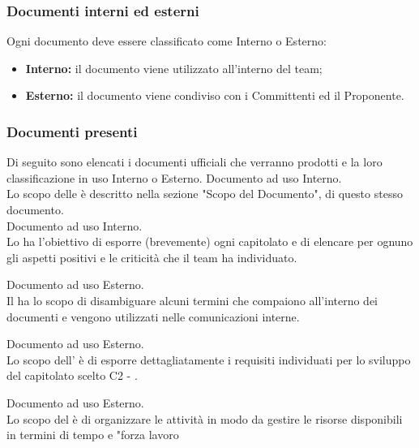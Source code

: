     \subsubsection{Documenti interni ed esterni}
      Ogni documento deve essere classificato come Interno o Esterno:
      \begin{itemize}
        \item \textbf{Interno:} il documento viene utilizzato all'interno del team;
        \item \textbf{Esterno:} il documento viene condiviso con i Committenti ed il Proponente.
      \end{itemize}

    \subsubsection{Documenti presenti}
      Di seguito sono elencati i documenti ufficiali che verranno prodotti e la loro classificazione in uso Interno o Esterno.
        Documento ad uso Interno.\\
        Lo scopo delle \textit{\NdP{}} è descritto nella sezione  "Scopo del Documento", di questo stesso documento.\\

        Documento ad uso Interno.\\
        Lo \textit{\SdF{}} ha l'obiettivo di esporre (brevemente) ogni capitolato e di elencare per ognuno gli aspetti positivi e le criticità che il team ha individuato.

        Documento ad uso Esterno.\\
       	Il \Glossario{}  ha lo scopo di disambiguare alcuni termini che compaiono all'interno dei documenti e vengono utilizzati nelle comunicazioni interne.

        Documento ad uso Esterno.\\
        Lo  scopo  dell'\textit{\AdR{}} è di esporre dettagliatamente i requisiti individuati per lo sviluppo del capitolato scelto C2 - \NomeProgetto{}.

        Documento ad uso Esterno.\\
        Lo scopo del \textit{\PdP{}} è di organizzare le attività in modo da gestire le risorse disponibili in termini di tempo e "forza lavoro

